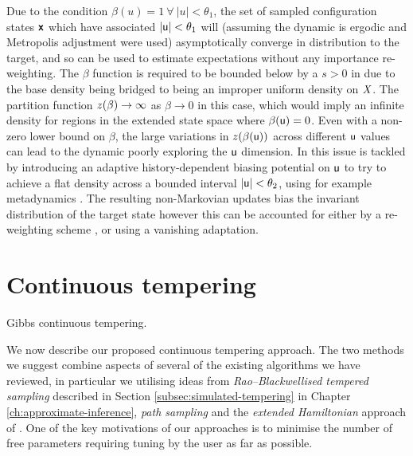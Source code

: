 Due to the condition $\beta(u) = 1 ~\forall~ |u| < \theta_1$, the set of sampled configuration states $\boldsymbol{\mathsf{x}}$ which have associated $|\mathsf{u}| < \theta_1$ will (assuming the dynamic is ergodic and Metropolis adjustment were used) asymptotically converge in distribution to the target, and so can be used to estimate expectations without any importance re-weighting. The $\beta$ function is required to be bounded below by a $s > 0$ in \citep{gobbo2015extended} due to the base density being bridged to being an improper uniform density on $\mathit{X}$. The partition function $z(\beta) \to \infty$ as $\beta \to  0$ in this case, which would imply an infinite density for regions in the extended state space where $\beta(\mathsf{u}) = 0$. Even with a non-zero lower bound on $\beta$, the large variations in $\partfunc\lpa\beta(\rvar{u})\rpa$  across different $\mathsf{u}$ values can lead to the dynamic poorly exploring the $\mathsf{u}$ dimension. In \citep{gobbo2015extended} this issue is tackled by introducing an adaptive history-dependent biasing potential on $\mathsf{u}$ to try to achieve a flat density across a bounded interval $|\mathsf{u}| < \theta_2$, using for example metadynamics \citep{laio2002escaping}. The resulting non-Markovian updates bias the invariant distribution of the target state however this can be accounted for either by a re-weighting scheme \citep{bonomi2009reconstructing}, or using a vanishing adaptation.

\section{Continuous tempering}\label{sec:proposed-approach}

\begin{algorithm}[t]
\caption{Gibbs continuous tempering.}
\label{alg:gibbs-continuous-tempering}

\end{algorithm}

We now describe our proposed continuous tempering approach. The two methods we suggest combine aspects of several of the existing algorithms we have reviewed, in particular we utilising ideas from \emph{Rao--Blackwellised tempered sampling} \citep{carlson2016partition} described in Section \ref{subsec:simulated-tempering} in Chapter \ref{ch:approximate-inference}, \emph{path sampling} \citep{gelman1998simulating} and the \emph{extended Hamiltonian} approach of \citep{gobbo2015extended}. One of the key motivations of our approaches is to minimise the number of free parameters requiring tuning by the user as far as possible.

